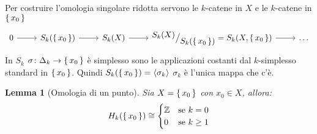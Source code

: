 \documentclass[10pt, twoside=false, x11names]{scrbook}
\newtheorem{lemma}[theorem]{Lemma}
\newcommand{\Z}{\mathbb{Z}}
\newcommand*\quot[2]{{^{\textstyle #1}\big/_{\textstyle #2}}}
\begin{document}
Per costruire l'omologia singolare ridotta servono le $ k $-catene in $ X $ e le
$ k $-catene in $ \set{x_0} $
\[
  \begin{tikzcd}
    0 \arrow{r}{} & S_k(\set{x_0}) \arrow{r}{} & S_k(X) \arrow{r}{} & \quot{S_k(X)}{S_k({\set{x_0}})} = S_k(X, \set{x_0}) \arrow{r}{} & \dots
  \end{tikzcd}
\]
In $ S_k $ $ \sigma \colon \Delta_k \to \set{x_0} $ è simplesso sono le applicazioni costanti
dal $ k $-simplesso standard in $ \set{x_0} $. Quindi $ S_k(\set{x_0}) = \langle\sigma_k\rangle $
$ \sigma_k $ è l'unica mappa che c'è.

\begin{lemma}[Omologia di un punto]
  Sia $ X = \set{x_0} $ con $ x_0 \in X $, allora:
  \[
    H_k(\set{x_0}) \cong
    \begin{cases}
      \Z & \text{se } k = 0 \\
      0 & \text{se } k \geq 1
    \end{cases}
  \]
\end{lemma}
\end{document}
